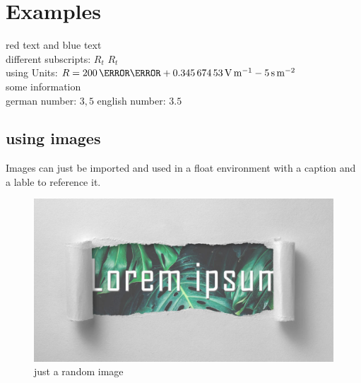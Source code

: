 \documentclass[	%
		11pt,a4paper,	%
		twoside,		%
		english,		%
		f1				%
	]{HsH-report}		%
\begin{document}

\maketitle				%
\declarationAuthorship

\begin{abstract}
	\lipsum[5-8]
\end{abstract}

\tableofcontents

\cleardoublepage %

\chapter{Examples}
	\label{chap: one}
	{\color{red}red text} and {\color{blue}blue text} \\
	different subscripts: \normalsubscripts$R_t$ \upsubscripts$R_t$ \\
	using Units: $R=200\,\milli\ohm + \SI{0.34567453}{\volt\per\metre} - 5\,\si{\second\per\metre\squared}$ \\
	some information\cite{laboranleitung:physik}\\
	german number: $3,5$ english number: $3.5$\\ %

	\section{using images}
	Images can just be imported and used in a float environment with a caption and a lable to reference it.
	\begin{figure}
		\includegraphics[width=.6\textwidth]{img/lorem-ipsum.jpg}
		\caption{just a random image}
	\end{figure}
\end{document}
